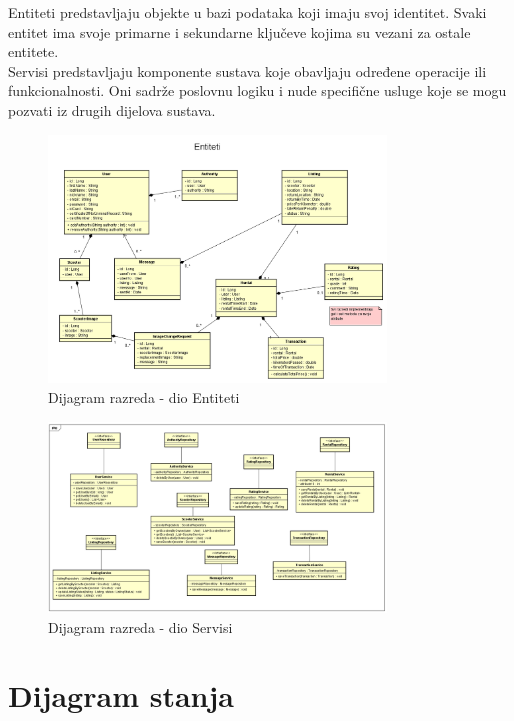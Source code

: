 			 \indent Entiteti predstavljaju objekte u bazi podataka koji imaju svoj identitet. Svaki entitet ima svoje primarne i sekundarne ključeve kojima su vezani za ostale entitete. \\
			 
			 \indent Servisi predstavljaju komponente sustava koje obavljaju određene operacije ili funkcionalnosti. Oni sadrže poslovnu logiku i nude specifične usluge koje se mogu pozvati iz drugih dijelova sustava. \\
			 
			\begin{figure}[H]
				\centering
				\includegraphics[width=0.8\textwidth]{dijagrami/entiteti.png}
				\caption{Dijagram razreda - dio Entiteti}
				\label{fig:your_label}
			\end{figure}
			
			\begin{figure}[H]
				\centering
				\includegraphics[width=0.8\textwidth]{dijagrami/servisi.png}
				\caption{Dijagram razreda - dio Servisi}
				\label{fig:your_label}
			\end{figure}
			
			
			\eject
		
		\section{Dijagram stanja}
			
